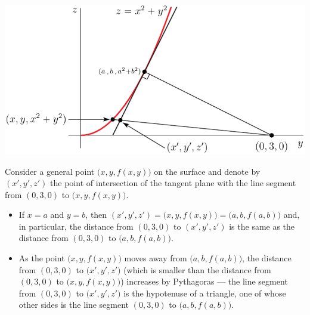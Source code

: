 \begin{eg}[Optional]
{\begin{efig}
\begin{center}
   \includegraphics{distanceSide.pdf}
\end{center}
\end{efig}

Consider a general point $\big(x,y,f(x,y)\big)$ on the surface and 
denote by $(x',y',z')$ the point of intersection of the tangent plane
with the line segment from $(0,3,0)$ to $\big(x,y,f(x,y)\big)$. 
\begin{itemize}
\item 
If $x=a$ and $y=b$, then $(x',y',z')=\big(x,y,f(x,y)\big)=\big(a,b,f(a,b)\big)$
and, in particular, the distance from $(0,3,0)$ to $(x',y',z')$
is the same as the distance from $(0,3,0)$ to $\big(a,b,f(a,b)\big)$.
\item
As the point $\big(x,y,f(x,y)\big)$ moves away from $\big(a,b,f(a,b)\big)$,
the distance from $(0,3,0)$ to $\big(x',y',z'\big)$ (which is smaller than
the distance from $(0,3,0)$ to $\big(x,y,f(x,y)\big)$)
increases by Pythagoras --- the line segment from 
$(0,3,0)$ to $\big(x',y',z'\big)$ is the hypotenuse of a triangle, one of 
whose other sides is the line segment $(0,3,0)$ to $\big(a,b,f(a,b)\big)$.
\end{itemize}

}
\end{eg}
